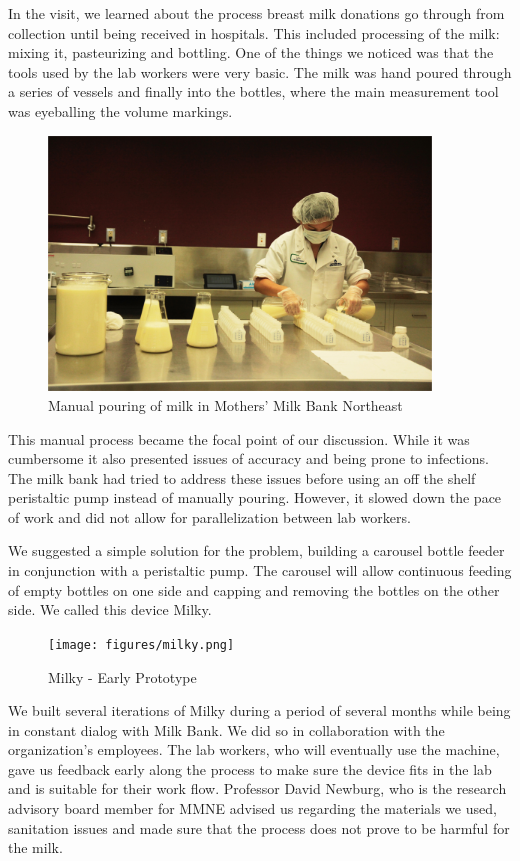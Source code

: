 In the visit, we learned about the process breast milk donations go through from collection until being received in hospitals. This included processing of the milk: mixing it, pasteurizing and bottling. One of the things we noticed was that the tools used by the lab workers were very basic. The milk was hand poured through a series of vessels and finally into the bottles, where the main measurement tool was eyeballing the volume markings. 

   \begin{figure}[thpb]
      \centering
      \includegraphics[width=4in]{figures/mmne-manual.png}
      \caption{Manual pouring of milk in Mothers' Milk Bank Northeast}
      \label{mmne-manual}
   \end{figure}

This manual process became the focal point of our discussion. While it was cumbersome it also presented issues of accuracy and being prone to infections. The milk bank had tried to address these issues before using an off the shelf peristaltic pump instead of manually pouring. However, it slowed down the pace of work and did not allow for parallelization between lab workers. 

We suggested a simple solution for the problem, building a carousel bottle feeder in conjunction with a peristaltic pump. The carousel will allow continuous feeding of empty bottles on one side and capping and removing the bottles on the other side. We called this device Milky. 

   \begin{figure}[thpb]
      \centering
      \texttt{[image: figures/milky.png]}
      \caption{Milky - Early Prototype}
      \label{milky}
   \end{figure}

We built several iterations of Milky during a period of several months while being in constant dialog with Milk Bank. We did so in collaboration with the organization's employees. The lab workers, who will eventually use the machine, gave us feedback early along the process to make sure the device fits in the lab and is suitable for their work flow. Professor David Newburg, who is the research advisory board member for MMNE advised us regarding the materials we used, sanitation issues and made sure that the process does not prove to be harmful for the milk. 

